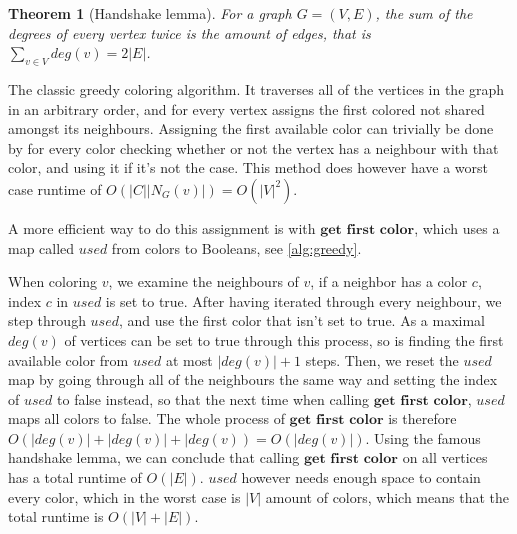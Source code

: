 \documentclass[a4paper]{article}
\newtheorem{theorem}{Theorem}[section]
\begin{document}
\begin{theorem}[Handshake lemma]{\cite{GraphBasics}}
    For a graph $G = (V,E)$, the sum of the degrees of every vertex twice is
    the amount of edges, that is $\sum_{v \in V} deg(v) = 2|E|$.
\end{theorem}

The classic greedy coloring algorithm. It traverses all of the vertices in the graph
in an arbitrary order, and for every vertex assigns the first colored not shared
amongst its neighbours. Assigning the first available color can trivially be done
by for every color checking whether or not the vertex has a neighbour with that color,
and using it if it's not the case. This method does however
have a worst case runtime of $O(|C||N_G(v)|) = O(|V|^2)$. 

A more efficient way to do this assignment is with $\textbf{get first color}$,
which uses a map called $used$ from colors to Booleans, see \autoref{alg:greedy}. 

When coloring $v$, we examine the
neighbours of $v$, if a neighbor has a color $c$, index $c$ in $used$ is set to
true. After having iterated through every neighbour, we step through $used$,
and use the first color that isn't set to true. As a maximal $deg(v)$ of
vertices can be set to true through this process, so is finding the first available
color from $used$ at most  $|deg(v)|+1$ steps. Then, we reset the
$used$ map by going through all of the neighbours the same way and setting the
index of $used$ to false instead, so that the next time when calling
$\textbf{get first color}$, $used$ maps all colors to false. The whole process
of $\textbf{get first color}$ is therefore $O(|deg(v)|+|deg(v)| + |deg(v)) =
O(|deg(v)|)$. Using the famous handshake lemma, we can conclude that calling
$\textbf{get first color}$ on all vertices has a total runtime of $O(|E|)$.
$used$ however needs enough space to contain every color, which in the worst
case is $|V|$ amount of colors, which means that the total runtime is
$O(|V|+|E|)$.

\end{document}
